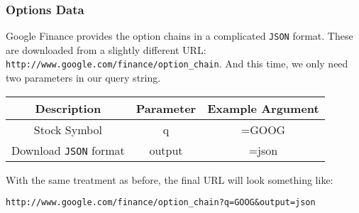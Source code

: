 \documentclass[../Dissertation.tex]{subfiles}
\begin{document}
\subsubsection{Options Data}

Google Finance provides the option chains in a complicated \lstinline|JSON| format.
These are downloaded from a slightly different URL: \lstinline|http://www.google.com/finance/option_chain|.
And this time, we only need two parameters in our query string.
\begin{center}
 \begin{tabular}{||c c c||} 
 \hline
 Description & Parameter & Example Argument \\ [0.5ex] 
 \hline\hline
 Stock Symbol & q & =GOOG\\ 
 \hline
 Download \lstinline|JSON| format & output & =json \\ [1ex] 
 \hline
\end{tabular}
\end{center}
With the same treatment as before, the final URL will look something like:
\begin{center}
\lstinline|http://www.google.com/finance/option_chain?q=GOOG&output=json|
\end{center}
\end{document}
